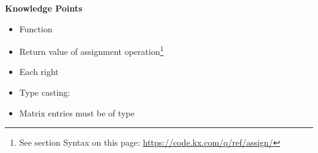 \begin{noteblock}
\textbf{Knowledge Points}
\begin{itemize}
\item Function \href{https://code.kx.com/q/ref/til/}{} 
\item Return value of assignment operation\footnote{See section Syntax on this page: \url{https://code.kx.com/q/ref/assign/}}
\item Each right \href{https://code.kx.com/q/ref/maps/#each-left-and-each-right}{\q{/:}}
\item Type casting: \href{https://code.kx.com/q/ref/cast/}{\q{$}}
\item Matrix entries must be of  type
\end{itemize}
\end{noteblock}

\clearpage
